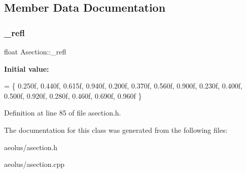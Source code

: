 \subsection{Member Data Documentation}
\mbox{\label{class_asection_a65f02ccc4bcc279787a6d6a4fc8a2b13}} 
\subsubsection{\texorpdfstring{\+\_\+refl}{\_refl}}
{\footnotesize\ttfamily float Asection\+::\+\_\+refl\hspace{0.3cm}{\ttfamily [static]}}

{\bfseries Initial value\+:}
\begin{DoxyCode}
=
\{
    0.250f, 0.440f, 0.615f, 0.940f,
    0.200f, 0.370f, 0.560f, 0.900f,
    0.230f, 0.400f, 0.500f, 0.920f,
    0.280f, 0.460f, 0.690f, 0.960f
\}
\end{DoxyCode}


Definition at line 85 of file asection.\+h.



The documentation for this class was generated from the following files\+:\begin{DoxyCompactItemize}
\item 
aeolus/asection.\+h\item 
aeolus/asection.\+cpp\end{DoxyCompactItemize}
